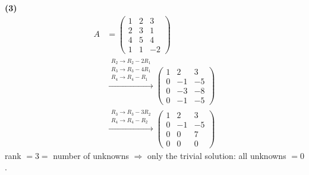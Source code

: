 \noindent\textbf{(3)}
\begin{align*}
A &= \begin{pmatrix}1 & 2 & 3 \\ 2 & 3 & 1 \\ 4 & 5 & 4 \\ 1 & 1 & -2\end{pmatrix} \\
&\xrightarrow{\substack{R_2\to R_2-2R_1\\ R_3\to R_3-4R_1\\ R_4\to R_4-R_1}} \begin{pmatrix}1 & 2 & 3 \\ 0 & -1 & -5 \\ 0 & -3 & -8 \\ 0 & -1 & -5\end{pmatrix} \\
&\xrightarrow{\substack{R_3\to R_3-3R_2\\ R_4\to R_4-R_2}} \begin{pmatrix}1 & 2 & 3 \\ 0 & -1 & -5 \\ 0 & 0 & 7 \\ 0 & 0 & 0\end{pmatrix}
\end{align*}
rank $=3=$ number of unknowns $\Rightarrow$ only the trivial solution: all unknowns $=0$.

